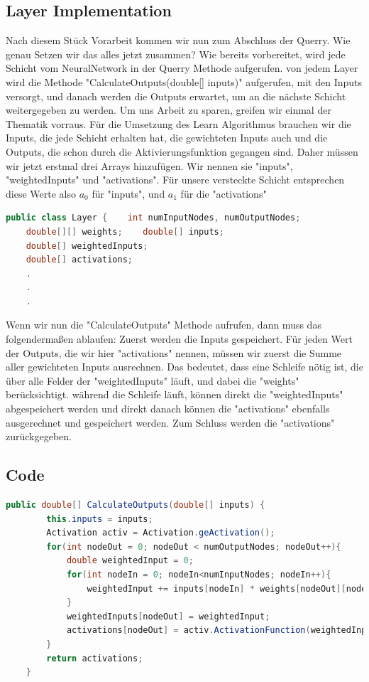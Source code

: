 \documentclass[12pt]{article}
\begin{document}
\subsection{Layer Implementation}
Nach diesem Stück Vorarbeit kommen wir nun zum Abschluss der Querry. Wie genau Setzen wir das alles jetzt zusammen?
Wie bereits vorbereitet, wird jede Schicht vom NeuralNetwork in der Querry Methode aufgerufen. von jedem Layer wird die Methode "CalculateOutputs(double[] inputs)" aufgerufen, mit den Inputs versorgt, und danach werden die Outputs erwartet, um an die nächste Schicht weitergegeben zu werden.
Um uns Arbeit zu sparen, greifen wir einmal der Thematik vorraus. Für die Umsetzung des Learn Algorithmus brauchen wir die Inputs, die jede Schicht erhalten hat, die gewichteten Inputs auch und die Outputs, die schon durch die Aktivierungsfunktion gegangen sind. Daher müssen wir jetzt erstmal drei Arrays hinzufügen. Wir nennen sie "inputs", "weightedInputs" und "activations". Für unsere versteckte Schicht entsprechen diese Werte also $a_0$ für "inputs", und $a_1$ für die "activations"
\begin{lstlisting}[language=Java]
public class Layer {    int numInputNodes, numOutputNodes;
    double[][] weights;    double[] inputs;
    double[] weightedInputs;
    double[] activations;
    .
    .
    .
\end{lstlisting}Wenn wir nun die "CalculateOutputs" Methode aufrufen, dann muss das folgendermaßen ablaufen:
Zuerst werden die Inputs gespeichert.
Für jeden Wert der Outputs, die wir hier "activations" nennen, müssen wir zuerst die Summe aller gewichteten Inputs ausrechnen. Das bedeutet, dass eine Schleife nötig ist, die über alle Felder der "weightedInputs" läuft, und dabei die "weights" berücksichtigt. während die Schleife läuft, können direkt die "weightedInputs" abgespeichert werden und direkt danach können die "activations" ebenfalls ausgerechnet und gespeichert werden. Zum Schluss werden die "activations" zurückgegeben.
\subsection{Code}
\begin{lstlisting}[language=Java]
    public double[] CalculateOutputs(double[] inputs) {
        this.inputs = inputs;
        Activation activ = Activation.geActivation();
        for(int nodeOut = 0; nodeOut < numOutputNodes; nodeOut++){
            double weightedInput = 0;
            for(int nodeIn = 0; nodeIn<numInputNodes; nodeIn++){
                weightedInput += inputs[nodeIn] * weights[nodeOut][nodeIn];
            }
            weightedInputs[nodeOut] = weightedInput;
            activations[nodeOut] = activ.ActivationFunction(weightedInput);
        }
        return activations;
    }
\end{lstlisting}
\end{document}

